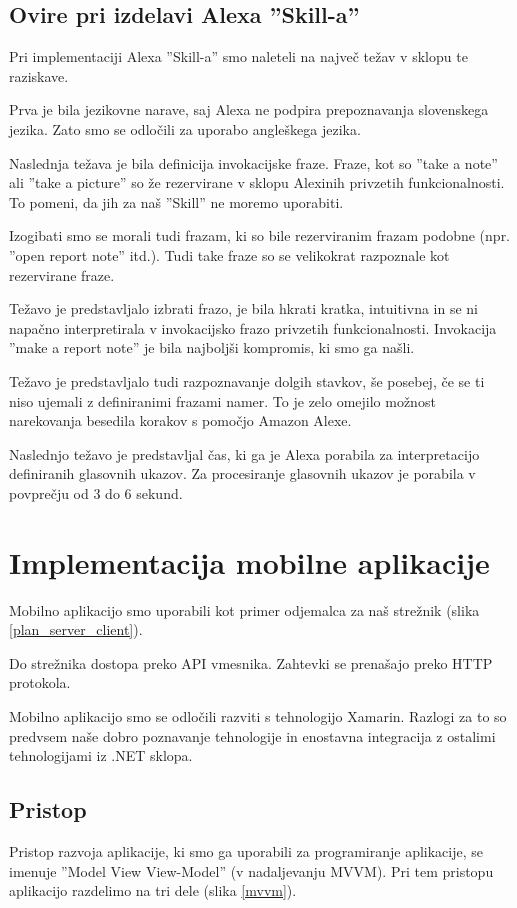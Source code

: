 \documentclass[a4paper, 12pt]{book}
\begin{document}
\subsection{Ovire pri izdelavi Alexa ''Skill-a''}

Pri implementaciji Alexa ''Skill-a'' smo naleteli na največ težav v sklopu te raziskave.

Prva je bila jezikovne narave, saj Alexa ne podpira prepoznavanja slovenskega jezika.
Zato smo se odločili za uporabo angleškega jezika.

Naslednja težava je bila definicija invokacijske fraze.
Fraze, kot so ''take a note'' ali ''take a picture'' so že rezervirane v sklopu Alexinih privzetih funkcionalnosti.
To pomeni, da jih za naš ''Skill'' ne moremo uporabiti.

Izogibati smo se morali tudi frazam, ki so bile rezerviranim frazam podobne (npr. ''open report note'' itd.).
Tudi take fraze so se velikokrat razpoznale kot rezervirane fraze.

Težavo je predstavljalo izbrati frazo, je bila hkrati kratka, intuitivna in se ni napačno interpretirala v invokacijsko frazo privzetih funkcionalnosti.
Invokacija ''make a report note'' je bila najboljši kompromis, ki smo ga našli.

Težavo je predstavljalo tudi razpoznavanje dolgih stavkov, še posebej, če se ti niso ujemali z definiranimi frazami namer.
To je zelo omejilo možnost narekovanja besedila korakov s pomočjo Amazon Alexe.

Naslednjo težavo je predstavljal čas, ki ga je Alexa porabila za interpretacijo definiranih glasovnih ukazov.
Za procesiranje glasovnih ukazov je porabila v povprečju od 3 do 6 sekund.

\section{Implementacija mobilne aplikacije}

Mobilno aplikacijo smo uporabili kot primer odjemalca za naš strežnik (slika \ref{plan_server_client}).

Do strežnika dostopa preko API vmesnika.
Zahtevki se prenašajo preko HTTP protokola.

Mobilno aplikacijo smo se odločili razviti s tehnologijo Xamarin.
Razlogi za to so predvsem naše dobro poznavanje tehnologije in enostavna integracija z ostalimi tehnologijami iz .NET sklopa.


\subsection{Pristop}
Pristop razvoja aplikacije, ki smo ga uporabili za programiranje aplikacije, se imenuje ''Model View View-Model'' (v nadaljevanju MVVM).
Pri tem pristopu aplikacijo razdelimo na tri dele (slika \ref{mvvm}).
\end{document}
